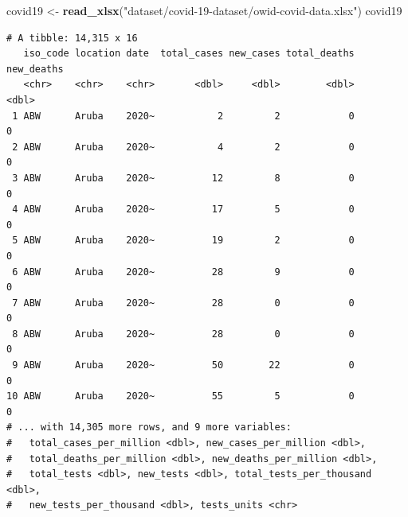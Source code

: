 \documentclass[
  11pt,
]{krantz}
\newenvironment{Shaded}{\begin{snugshade}}{\end{snugshade}}
\newcommand{\CommentTok}[1]{\textcolor[rgb]{0.37,0.37,0.37}{\textit{#1}}}
\newcommand{\ControlFlowTok}[1]{\textcolor[rgb]{0.27,0.27,0.27}{\textbf{#1}}}
\newcommand{\DataTypeTok}[1]{\textcolor[rgb]{0.27,0.27,0.27}{#1}}
\newcommand{\KeywordTok}[1]{\textcolor[rgb]{0.27,0.27,0.27}{\textbf{#1}}}
\newcommand{\NormalTok}[1]{#1}
\newcommand{\OperatorTok}[1]{\textcolor[rgb]{0.43,0.43,0.43}{\textbf{#1}}}
\newcommand{\StringTok}[1]{\textcolor[rgb]{0.5,0.5,0.5}{#1}}
\begin{document}
\begin{Shaded}
\begin{Highlighting}[]
\NormalTok{covid19 <-}\StringTok{ }\KeywordTok{read_xlsx}\NormalTok{(}\StringTok{"dataset/covid-19-dataset/owid-covid-data.xlsx"}\NormalTok{)}
\NormalTok{covid19}
\end{Highlighting}
\end{Shaded}

\begin{verbatim}
# A tibble: 14,315 x 16
   iso_code location date  total_cases new_cases total_deaths new_deaths
   <chr>    <chr>    <chr>       <dbl>     <dbl>        <dbl>      <dbl>
 1 ABW      Aruba    2020~           2         2            0          0
 2 ABW      Aruba    2020~           4         2            0          0
 3 ABW      Aruba    2020~          12         8            0          0
 4 ABW      Aruba    2020~          17         5            0          0
 5 ABW      Aruba    2020~          19         2            0          0
 6 ABW      Aruba    2020~          28         9            0          0
 7 ABW      Aruba    2020~          28         0            0          0
 8 ABW      Aruba    2020~          28         0            0          0
 9 ABW      Aruba    2020~          50        22            0          0
10 ABW      Aruba    2020~          55         5            0          0
# ... with 14,305 more rows, and 9 more variables:
#   total_cases_per_million <dbl>, new_cases_per_million <dbl>,
#   total_deaths_per_million <dbl>, new_deaths_per_million <dbl>,
#   total_tests <dbl>, new_tests <dbl>, total_tests_per_thousand <dbl>,
#   new_tests_per_thousand <dbl>, tests_units <chr>
\end{verbatim}

\begin{Shaded}
\end{Shaded}
\end{document}

